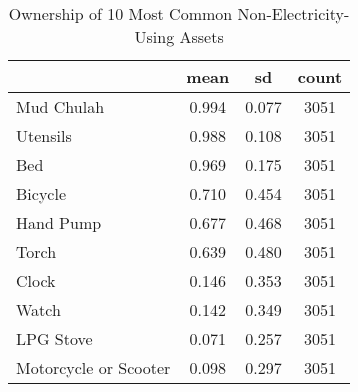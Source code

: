 \begin{table}[htbp]\centering
\def\sym#1{\ifmmode^{#1}\else\(^{#1}\)\fi}
\caption{Ownership of 10 Most Common Non-Electricity-Using Assets \label{tab:"label"}}
\begin{tabular*}{0.9\hsize}{@{\hskip\tabcolsep\extracolsep\fill}l*{1}{ccc}}
\toprule
                                &     mean&       sd&    count\\
\midrule
Mud Chulah                      &    0.994&    0.077&     3051\\
Utensils                        &    0.988&    0.108&     3051\\
Bed                             &    0.969&    0.175&     3051\\
Bicycle                         &    0.710&    0.454&     3051\\
Hand Pump                       &    0.677&    0.468&     3051\\
Torch                           &    0.639&    0.480&     3051\\
Clock                           &    0.146&    0.353&     3051\\
Watch                           &    0.142&    0.349&     3051\\
LPG Stove                       &    0.071&    0.257&     3051\\
Motorcycle or Scooter           &    0.098&    0.297&     3051\\
\bottomrule
\end{tabular*}
\end{table}
